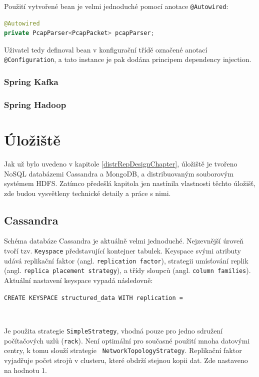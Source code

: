 \noindent Použití vytvořené bean je velmi jednoduché pomocí anotace \texttt{@Autowired}:

\begin{lstlisting}[language=Java,frame=tb,basicstyle={\small\ttfamily}]
@Autowired
private PcapParser<PcapPacket> pcapParser;
\end{lstlisting}

\noindent Uživatel tedy definoval bean v konfigurační třídě označené anotací \texttt{@Configuration}, a tato instance je pak dodána principem dependency injection.

\subsubsection{Spring Kafka}

\subsubsection{Spring Hadoop}

\section{Úložiště}
Jak už bylo uvedeno v kapitole \ref{distrRepDesignChapter}, úložiště je tvořeno NoSQL databázemi Cassandra a MongoDB, a distribuovaným souborovým systémem HDFS. Zatímco předešlá kapitola jen nastínila vlastnosti těchto úložišť, zde budou vysvětleny technické detaily a práce s nimi.

\subsection{Cassandra}
Schéma databáze Cassandra je aktuálně velmi jednoduché. Nejzevnější úroveň tvoří tzv. \texttt{Keyspace} představující kontejner tabulek. Keyspace svými atributy udává replikační faktor (angl. \texttt{replication factor}), strategii umísťování replik (angl. \texttt{replica placement strategy}), a třídy sloupců (angl. \texttt{column families}). Aktuální nastavení keyspace vypadá následovně:

\vspace{0.5cm}
\texttt{CREATE KEYSPACE structured\_data WITH replication = }

\texttt{ }

\vspace{0.5cm}
\noindent Je použita strategie \texttt{SimpleStrategy}, vhodná pouze pro jedno sdružení počítačových uzlů (\texttt{rack}). Není optimální pro současné použití mnoha datovými centry, k tomu slouží strategie \texttt{ NetworkTopologyStrategy}. Replikační faktor vyjadřuje počet strojů v clusteru, které obdrží stejnou kopii dat. Zde nastaveno na hodnotu 1.

